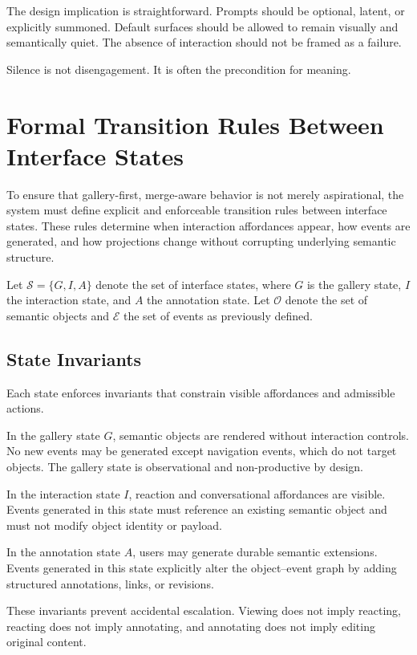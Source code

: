 \documentclass[11pt,oneside]{article}
\begin{document}
The design implication is straightforward. Prompts should be optional, latent, or explicitly summoned. Default surfaces should be allowed to remain visually and semantically quiet. The absence of interaction should not be framed as a failure.

Silence is not disengagement. It is often the precondition for meaning.

\section{Formal Transition Rules Between Interface States}

To ensure that gallery-first, merge-aware behavior is not merely aspirational, the system must define explicit and enforceable transition rules between interface states. These rules determine when interaction affordances appear, how events are generated, and how projections change without corrupting underlying semantic structure.

Let $\mathcal{S} = \{G, I, A\}$ denote the set of interface states, where $G$ is the gallery state, $I$ the interaction state, and $A$ the annotation state. Let $\mathcal{O}$ denote the set of semantic objects and $\mathcal{E}$ the set of events as previously defined.

\subsection{State Invariants}

Each state enforces invariants that constrain visible affordances and admissible actions.

In the gallery state $G$, semantic objects are rendered without interaction controls. No new events may be generated except navigation events, which do not target objects. The gallery state is observational and non-productive by design.

In the interaction state $I$, reaction and conversational affordances are visible. Events generated in this state must reference an existing semantic object and must not modify object identity or payload.

In the annotation state $A$, users may generate durable semantic extensions. Events generated in this state explicitly alter the object–event graph by adding structured annotations, links, or revisions.

These invariants prevent accidental escalation. Viewing does not imply reacting, reacting does not imply annotating, and annotating does not imply editing original content.
\end{document}
